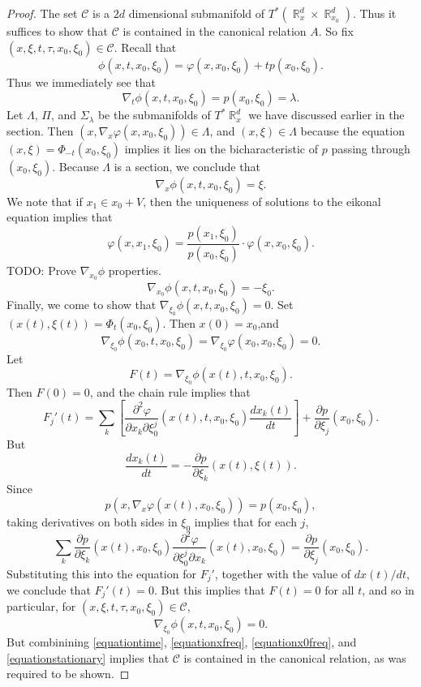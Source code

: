 \documentclass{article}
\theoremstyle{plain}
\theoremstyle{remark}
\theoremstyle{definition}
\DeclareMathOperator{\RR}{\mathbb{R}}
\begin{document}
\begin{proof}

	The set $\mathcal{C}$ is a $2d$ dimensional submanifold of $T^*(\RR^d_x \times \RR^d_{x_0})$. Thus it suffices to show that $\mathcal{C}$ is contained in the canonical relation $A$. So fix $(x,\xi,t,\tau,x_0,\xi_0) \in \mathcal{C}$. Recall that
	\[ \phi(x,t,x_0,\xi_0) = \varphi(x,x_0,\xi_0) + t p(x_0,\xi_0). \]
	Thus we immediately see that
	\begin{equation} \label{equationtime}
		\nabla_t \phi(x,t,x_0,\xi_0) = p(x_0,\xi_0) = \lambda.
	\end{equation}
	Let $\Lambda$, $\Pi$, and $\Sigma_\lambda$ be the submanifolds of $T^*\RR^d_x$ we have discussed earlier in the section. Then $(x, \nabla_x \varphi(x,x_0,\xi_0)) \in \Lambda$, and $(x, \xi) \in \Lambda$ because the equation $(x,\xi) = \Phi_{-t}(x_0,\xi_0)$ implies it lies on the bicharacteristic of $p$ passing through $(x_0,\xi_0)$. Because $\Lambda$ is a section, we conclude that
	\begin{equation} \label{equationxfreq}
		\nabla_x \phi(x,t,x_0,\xi_0) = \xi.
	\end{equation}
	We note that if $x_1 \in x_0 + V$, then the uniqueness of solutions to the eikonal equation implies that
	\[ \varphi(x,x_1,\xi_0) = \frac{p(x_1,\xi_0)}{p(x_0,\xi_0)} \cdot \varphi(x,x_0,\xi_0). \]
	TODO: Prove $\nabla_{x_0} \phi$ properties.
	\begin{equation} \label{equationx0freq}
		\nabla_{x_0} \phi(x,t,x_0,\xi_0) = - \xi_0.
	\end{equation}
	Finally, we come to show that $\nabla_{\xi_0} \phi(x,t,x_0,\xi_0) = 0$. Set $(x(t), \xi(t)) = \Phi_t(x_0,\xi_0)$. Then $x(0) = x_0$,and
	\[ \nabla_{\xi_0} \phi(x_0,t,x_0,\xi_0) = \nabla_{\xi_0} \varphi(x_0,x_0,\xi_0) = 0. \]
	Let
	\[ F(t) = \nabla_{\xi_0} \phi(x(t), t, x_0, \xi_0). \]
	Then $F(0) = 0$, and the chain rule implies that
	\[ F_j'(t) = \sum_k \left[ \frac{\partial^2 \varphi}{\partial x_k \partial \xi_0^j}(x(t), t, x_0, \xi_0) \frac{dx_k(t)}{dt} \right] + \frac{\partial p}{\partial \xi_j}(x_0,\xi_0). \]
	But
	\[ \frac{dx_k(t)}{dt} = - \frac{\partial p}{\partial \xi_k}( x(t), \xi(t) ). \]
	Since
	\[ p(x, \nabla_x \varphi(x(t) ,x_0,\xi_0)) = p(x_0, \xi_0), \]
	taking derivatives on both sides in $\xi_0$ implies that for each $j$,
	\[ \sum_k \frac{\partial p}{\partial \xi_k}(x(t), x_0, \xi_0) \frac{\partial^2 \varphi}{\partial \xi_0^j \partial x_k}(x(t), x_0, \xi_0) = \frac{\partial p}{\partial \xi_j}(x_0, \xi_0). \]
	Substituting this into the equation for $F_j'$, together with the value of $dx(t) / dt$, we conclude that $F_j'(t) = 0$. But this implies that $F(t) = 0$ for all $t$, and so in particular, for $(x,\xi,t,\tau,x_0,\xi_0) \in \mathcal{C}$,
	\begin{equation} \label{equationstationary}
		\nabla_{\xi_0} \phi(x,t,x_0,\xi_0) = 0.
	\end{equation}
	But combinining \eqref{equationtime}, \eqref{equationxfreq}, \eqref{equationx0freq}, and \eqref{equationstationary} implies that $\mathcal{C}$ is contained in the canonical relation, as was required to be shown.
\end{proof}
\end{document}
